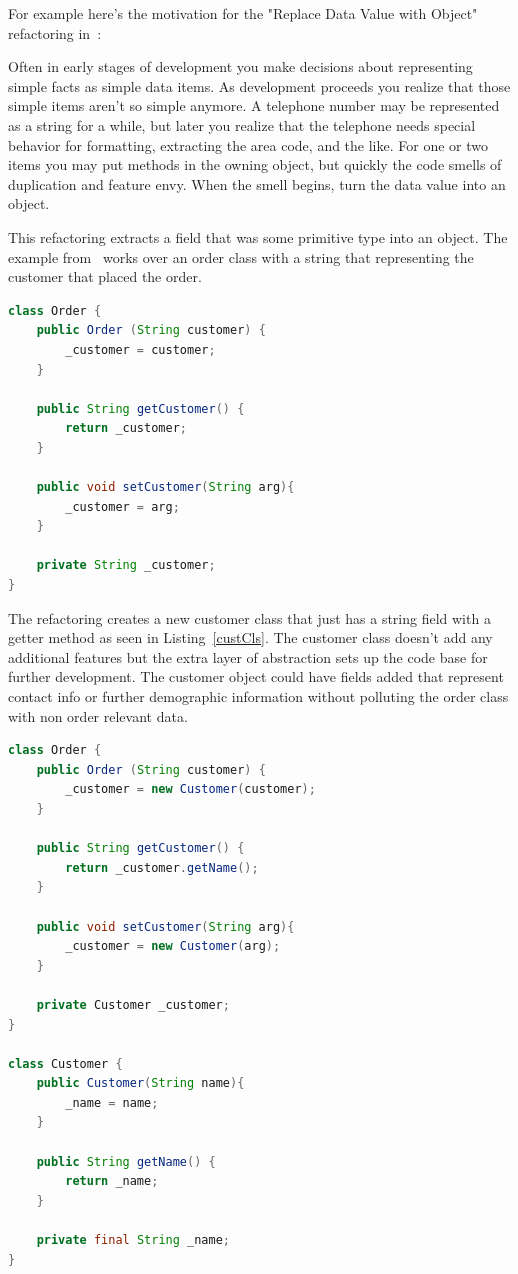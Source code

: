 For example here's the motivation for the "Replace Data Value with Object" refactoring in~\citep[pg. 175]{fowler}:

\begin{displayquote}
Often in early stages of development you make decisions about representing simple facts as simple data items. As development proceeds you realize that those simple items aren't so simple anymore. A telephone number may be represented as a string for a while, but later you realize that the telephone needs special behavior for formatting, extracting the area code, and the like. For one or two items you may put methods in the owning object, but quickly the code smells of duplication and feature envy. When the smell begins, turn the data value into an object.
\end{displayquote}

This refactoring extracts a field that was some primitive type into an object. The example from~\citep{fowler} works over an order class with a string that representing the customer that placed the order.

\begin{lstlisting}[caption={The Order class}, language = java, captionpos=b,tabsize=4]
class Order {
	public Order (String customer) {
		_customer = customer;	
	}
	
	public String getCustomer() {
		return _customer;
	}
	
	public void setCustomer(String arg){
		_customer = arg;	
	}
	
	private String _customer;
}
\end{lstlisting}

The refactoring creates a new customer class that just has a string field with a getter method as seen in Listing~\ref{custCls}. The customer class doesn't add any additional features but the extra layer of abstraction sets up the code base for further development. The customer object could have fields added that represent contact info or further demographic information without polluting the order class with non order relevant data.

\begin{lstlisting}[caption={The result of the Replace Data Value with Object refactoring when applied to the customer field of the order class.}, language = java, captionpos=b,label=custCls,tabsize=4]
class Order {
	public Order (String customer) {
		_customer = new Customer(customer);	
	}
	
	public String getCustomer() {
		return _customer.getName();
	}
	
	public void setCustomer(String arg){
		_customer = new Customer(arg);	
	}
	
	private Customer _customer;
}

class Customer {
	public Customer(String name){
		_name = name;
	}
	
	public String getName() {
		return _name;
	}
	
	private final String _name;
}
\end{lstlisting}


